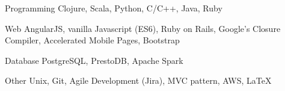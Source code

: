 

\begin{cvskills}

  \cvskill
    {Programming} %
    {Clojure, Scala, Python, C/C++, Java, Ruby} %

  \cvskill
    {Web} %
    {AngularJS, vanilla Javascript (ES6), Ruby on Rails, Google's Closure
      Compiler, Accelerated Mobile Pages, Bootstrap} %

  \cvskill
    {Database} %
    {PostgreSQL, PrestoDB, Apache Spark} %

  \cvskill
    {Other} %
    {Unix, Git, Agile Development (Jira), MVC pattern, AWS, LaTeX} %

\end{cvskills}
